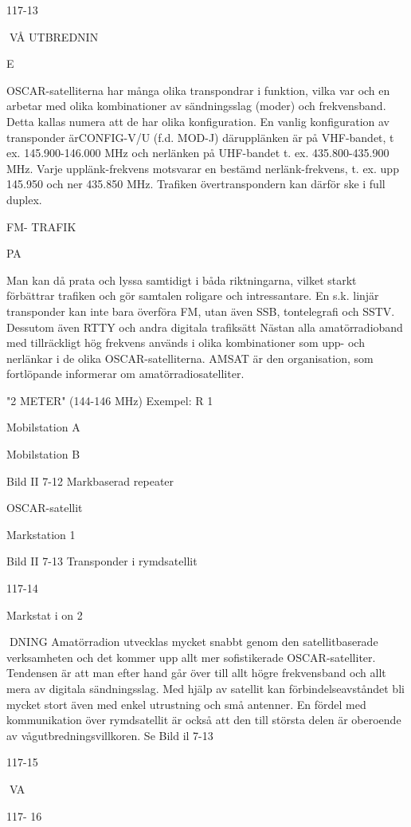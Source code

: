 \documentclass[a4paper,twoside,twocolumn,openright]{book}
\begin{document}
{{{{{117-13

VÅ UTBREDNIN

E

OSCAR-satelliterna har många olika transpondrar i funktion, vilka var och en arbetar
med olika kombinationer av sändningsslag
(moder) och frekvensband. Detta kallas numera att de har olika konfiguration.
En vanlig konfiguration av transponder
ärCONFIG-V/U (f.d. MOD-J) därupplänken
är på VHF-bandet, t ex. 145.900-146.000
MHz och nerlänken på UHF-bandet t. ex.
435.800-435.900 MHz. Varje upplänk-frekvens motsvarar en bestämd nerlänk-frekvens, t. ex. upp 145.950 och ner 435.850
MHz. Trafiken övertranspondern kan därför
ske i full duplex.

FM- TRAFIK

PA

Man kan då prata och lyssa samtidigt i
båda riktningarna, vilket starkt förbättrar trafiken och gör samtalen roligare och intressantare.
En s.k. linjär transponder kan inte bara
överföra FM, utan även SSB, tontelegrafi
och SSTV. Dessutom även RTTY och andra
digitala trafiksätt
Nästan alla amatörradioband med tillräckligt hög frekvens används i olika kombinationer som upp- och nerlänkar i de olika
OSCAR-satelliterna.
AMSAT är den organisation, som fortlöpande informerar om amatörradiosatelliter.

"2 METER" (144-146 MHz) Exempel: R 1

Mobilstation A

Mobilstation B

Bild II 7-12 Markbaserad repeater

OSCAR-satellit

Markstation 1

Bild II 7-13 Transponder i rymdsatellit

117-14

Markstat i on 2

DNING
Amatörradion utvecklas mycket snabbt
genom den satellitbaserade verksamheten
och det kommer upp allt mer sofistikerade
OSCAR-satelliter. Tendensen är att man
efter hand går över till allt högre frekvensband och allt mera av digitala sändningsslag.
Med hjälp av satellit kan förbindelseavståndet bli mycket stort även med enkel
utrustning och små antenner. En fördel med
kommunikation över rymdsatellit är också
att den till största delen är oberoende av
vågutbredningsvillkoren.
Se Bild il 7-13

117-15

VA

117- 16

}}}}}
\end{document}
